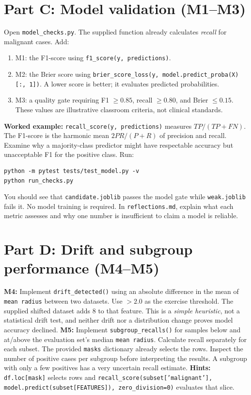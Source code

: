 \documentclass[11pt,a4paper]{article}
\begin{document}
\section{Part C: Model validation (M1--M3)}
Open \texttt{model\_checks.py}. The supplied function already calculates \emph{recall} for malignant cases. Add:
\begin{enumerate}
\item M1: the F1-score using \texttt{f1\_score(y, predictions)}.
\item M2: the Brier score using \texttt{brier\_score\_loss(y, model.predict\_proba(X)[:, 1])}. A lower score is better; it evaluates predicted probabilities.
\item M3: a quality gate requiring F1 $\geq 0.85$, recall $\geq 0.80$, and Brier $\leq 0.15$. These values are illustrative classroom criteria, not clinical standards.
\end{enumerate}
\noindent\textbf{Worked example:} \texttt{recall\_score(y, predictions)} measures $TP/(TP+FN)$. The F1-score is the harmonic mean $2PR/(P+R)$ of precision and recall. Examine why a majority-class predictor might have respectable accuracy but unacceptable F1 for the positive class. Run:
\begin{lstlisting}
python -m pytest tests/test_model.py -v
python run_checks.py
\end{lstlisting}
You should see that \texttt{candidate.joblib} passes the model gate while \texttt{weak.joblib} fails it. No model training is required. In \texttt{reflections.md}, explain what each metric assesses and why one number is insufficient to claim a model is reliable.
\section{Part D: Drift and subgroup performance (M4--M5)}
\textbf{M4:} Implement \texttt{drift\_detected()} using an absolute difference in the mean of \texttt{mean radius} between two datasets. Use $>2.0$ as the exercise threshold. The supplied shifted dataset adds 8 to that feature. This is a \emph{simple heuristic}, not a statistical drift test, and neither drift nor a distribution change proves model accuracy declined.
\textbf{M5:} Implement \texttt{subgroup\_recalls()} for samples below and at/above the evaluation set's median \texttt{mean radius}. Calculate recall separately for each subset. The provided \texttt{masks} dictionary already selects the rows. Inspect the number of positive cases per subgroup before interpreting the results. A subgroup with only a few positives has a very uncertain recall estimate.
\textbf{Hints:} \texttt{df.loc[mask]} selects rows and \texttt{recall\_score(subset['malignant'], model.predict(subset[FEATURES]), zero\_division=0)} evaluates that slice.
\end{document}
